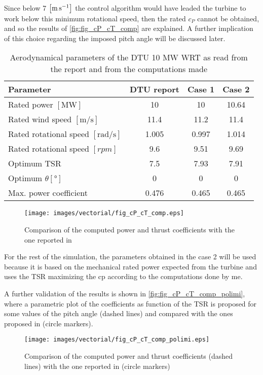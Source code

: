 Since below 7 $\left[\si{\meter\per\second}\right]$ the control algorithm would have leaded the turbine to work below this minimum rotational speed, then the rated $c_P$ cannot be obtained, and so the results of \autoref{fig:fig_cP_cT_comp} are explained. A further implication of this choice regarding the imposed pitch angle will be discussed later.

\begin{table}[htb]
    \caption{Aerodynamical parameters of the DTU 10 MW \acrshort{WRT} as read from the report and from the computations made}
    \centering
    \begin{tabular}{lccc}
    \toprule
    Parameter & DTU report & Case 1 & Case 2\\ \midrule
    Rated power $\left[\si{\mega \watt}\right]$ & 10 & 10 & 10.64  \\
    Rated wind speed $\left[\si{\meter \per \second}\right]$ & 11.4 & 11.2 & 11.4 \\
    Rated rotational speed $\left[\si{\radian \per \second}\right]$ & 1.005 & 0.997 & 1.014 \\
    Rated rotational speed $\left[rpm\right]$ & 9.6 & 9.51 & 9.69\\
    Optimum \acrshort{TSR} & 7.5 & 7.93 & 7.91\\
    Optimum $\theta \left[\si{\degree}\right]$ & 0 & 0 & 0 \\
    Max. power coefficient & 0.476 & 0.465 & 0.465 \\
    \bottomrule
    \end{tabular}
    \label{tab:DTU_10_aero}
\end{table}

\begin{figure}[htb]
    \centering
    \texttt{[image: images/vectorial/fig\_cP\_cT\_comp.eps]}
    \caption{Comparison of the computed power and thrust coefficients with the one reported in \cite{DTU_Wind_Energy_Report-I-0092}}
    \label{fig:fig_cP_cT_comp}
\end{figure}
For the rest of the simulation, the parameters obtained in the case 2 will be used because it is based on the mechanical rated power expected from the turbine and uses the \acrlong{TSR} maximizing the \acrlong{cp} according to the computations done by me.

A further validation of the results is shown in \autoref{fig:fig_cP_cT_comp_polimi}, where a parametric plot of the coefficients as function of the \acrshort{TSR} is proposed for some values of the pitch angle (dashed lines) and compared with the ones proposed in  \cite{Variable-speed_Variable-pitch_control_for_a_wind_t} (circle markers).
\begin{figure}[htb]
    \centering
    \texttt{[image: images/vectorial/fig\_cP\_cT\_comp\_polimi.eps]}
    \caption{Comparison of the computed power and thrust coefficients (dashed lines) with the one reported in \cite{Variable-speed_Variable-pitch_control_for_a_wind_t} (circle markers)}
    \label{fig:fig_cP_cT_comp_polimi}
\end{figure}

